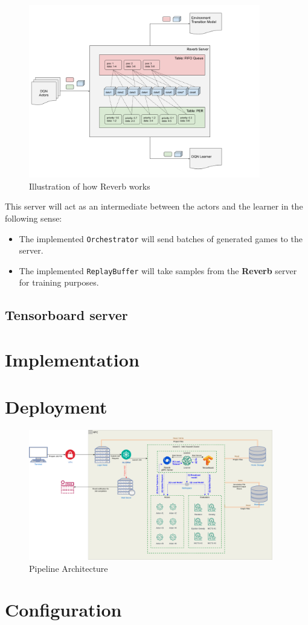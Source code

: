 \begin{figure}[H]
	\centering
	\includegraphics[width=0.9\textwidth]{Figures/ReverbTable.png}
	\caption{Illustration of how Reverb works}
\end{figure}
\FloatBarrier
This server will act as an intermediate between the actors and the learner in the following sense:
\begin{itemize}
	\item The implemented \texttt{Orchestrator} will send batches of generated games to the server.
	\item The implemented \texttt{ReplayBuffer} will take samples from the \textbf{Reverb} server for training purposes.
\end{itemize}

\subsection{Tensorboard server}
\section{Implementation}

\section{Deployment}

\begin{figure}
	\centering
	\includegraphics[width=0.95\textwidth]{Figures/AlphaZero.png}
	\caption{Pipeline Architecture}
\end{figure}
\section{Configuration}
